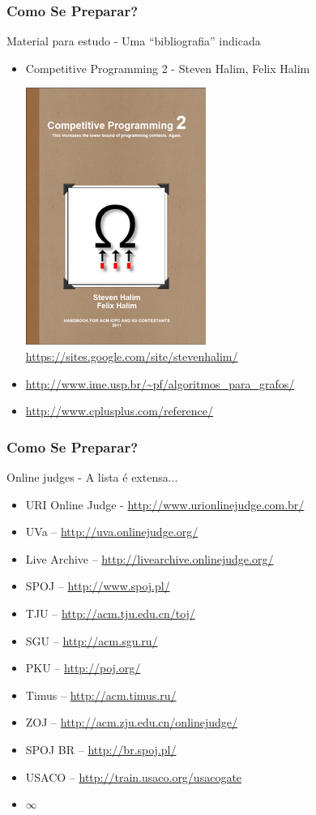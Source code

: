 \begin{frame}
\frametitle{Como Se Preparar?}
\begin{block}{Material para estudo - Uma ``bibliografia'' indicada}
\begin{itemize}
	\item Competitive Programming 2 - Steven Halim, Felix Halim
	\begin{center}
	\includegraphics[width=.2\textwidth]{figuras/cp2.png}\\
	\tiny\url{https://sites.google.com/site/stevenhalim/}
	\end{center}
	
	\item \url{http://www.ime.usp.br/~pf/algoritmos_para_grafos/}
	\item \url{http://www.cplusplus.com/reference/}	
\end{itemize}
\end{block}
\end{frame}


\begin{frame}
\frametitle{Como Se Preparar?}
\begin{block}{Online judges - A lista é extensa...}
\begin{itemize}
	\item URI Online Judge - \url{http://www.urionlinejudge.com.br/}
	\item UVa -- \url{http://uva.onlinejudge.org/}
	\item Live Archive -- \url{http://livearchive.onlinejudge.org/}
	\item SPOJ -- \url{http://www.spoj.pl/}
	\item TJU -- \url{http://acm.tju.edu.cn/toj/}
	\item SGU -- \url{http://acm.sgu.ru/}
	\item PKU -- \url{http://poj.org/}
	\item Timus -- \url{http://acm.timus.ru/}
	\item ZOJ -- \url{http://acm.zju.edu.cn/onlinejudge/}
	\item SPOJ BR  -- \url{http://br.spoj.pl/}
	\item USACO -- \url{http://train.usaco.org/usacogate}
	\item $\infty$
\end{itemize}
\end{block}
\end{frame}

